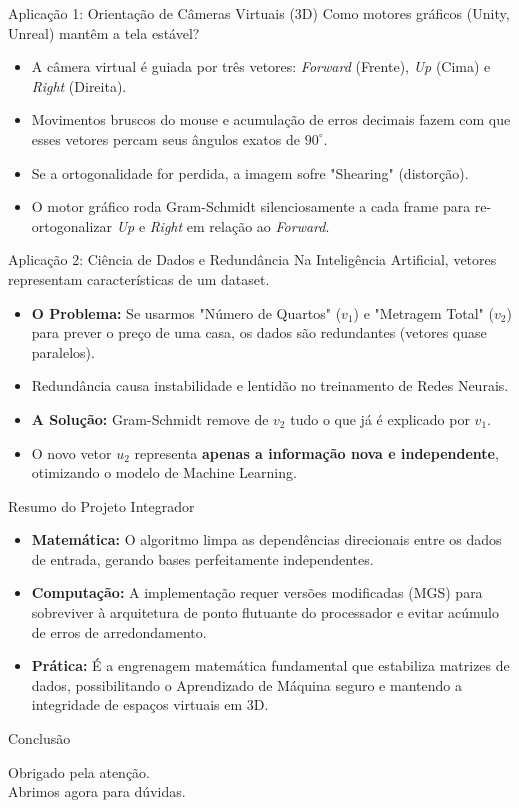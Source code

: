 \documentclass{beamer}
\begin{document}

\begin{frame}{Aplicação 1: Orientação de Câmeras Virtuais (3D)}
Como motores gráficos (Unity, Unreal) mantêm a tela estável?

\vspace{0.3cm}
\begin{itemize}
    \item A câmera virtual é guiada por três vetores: \textit{Forward} (Frente), \textit{Up} (Cima) e \textit{Right} (Direita).
    \item Movimentos bruscos do mouse e acumulação de erros decimais fazem com que esses vetores percam seus ângulos exatos de $90^\circ$.
    \item Se a ortogonalidade for perdida, a imagem sofre "Shearing" (distorção). 
    \item O motor gráfico roda Gram-Schmidt silenciosamente a cada frame para re-ortogonalizar \textit{Up} e \textit{Right} em relação ao \textit{Forward}.
\end{itemize}
\end{frame}

\begin{frame}{Aplicação 2: Ciência de Dados e Redundância}
Na Inteligência Artificial, vetores representam características de um dataset.

\vspace{0.3cm}
\begin{itemize}
    \item \textbf{O Problema:} Se usarmos "Número de Quartos" ($v_1$) e "Metragem Total" ($v_2$) para prever o preço de uma casa, os dados são redundantes (vetores quase paralelos).
    \item Redundância causa instabilidade e lentidão no treinamento de Redes Neurais.
    \item \textbf{A Solução:} Gram-Schmidt remove de $v_2$ tudo o que já é explicado por $v_1$.
    \item O novo vetor $u_2$ representa \textbf{apenas a informação nova e independente}, otimizando o modelo de Machine Learning.
\end{itemize}
\end{frame}

\begin{frame}{Resumo do Projeto Integrador}
\begin{itemize}
    \item \textbf{Matemática:} O algoritmo limpa as dependências direcionais entre os dados de entrada, gerando bases perfeitamente independentes.
    \item \textbf{Computação:} A implementação requer versões modificadas (MGS) para sobreviver à arquitetura de ponto flutuante do processador e evitar acúmulo de erros de arredondamento.
    \item \textbf{Prática:} É a engrenagem matemática fundamental que estabiliza matrizes de dados, possibilitando o Aprendizado de Máquina seguro e mantendo a integridade de espaços virtuais em 3D.
\end{itemize}
\end{frame}

\begin{frame}{Conclusão}
\begin{center}
\Large Obrigado pela atenção. \\
\vspace{0.5cm}
Abrimos agora para dúvidas.
\end{center}
\end{frame}
\end{document}
